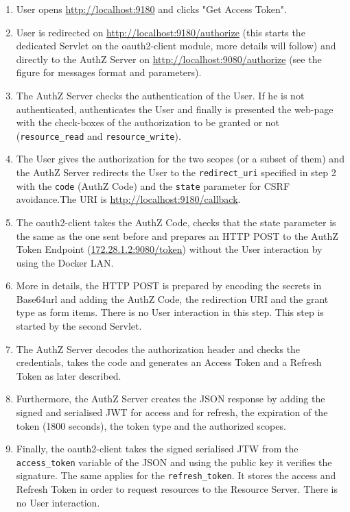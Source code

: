 \documentclass[a4paper,12pt]{article}
\begin{document}
\begin{enumerate}
    \item User opens \url{http://localhost:9180} and clicks "Get Access Token".
    \item User is redirected on \url{http://localhost:9180/authorize} (this starts the dedicated Servlet on the oauth2-client module, more details will follow) and directly to the AuthZ Server on \url{http://localhost:9080/authorize} (see the figure for messages format and parameters).
    \item The AuthZ Server checks the authentication of the User. If he is not authenticated, authenticates the User and finally is presented the web-page with the check-boxes of the authorization to be granted or not (\texttt{resource\_read} and \texttt{resource\_write}). 
    \item The User gives the authorization for the two scopes (or a subset of them) and the AuthZ Server redirects the User to the \texttt{redirect\_uri} specified in step 2 with the \texttt{code} (AuthZ Code) and the \texttt{state} parameter for CSRF avoidance.The URI is \url{http://localhost:9180/callback}.
    \item The oauth2-client takes the AuthZ Code, checks that the state parameter is the same as the one sent before and prepares an HTTP POST to the AuthZ Token Endpoint (\url{172.28.1.2:9080/token}) without the User interaction by using the Docker LAN.
    \item More in details, the HTTP POST is prepared by encoding the secrets in Base64url and adding the AuthZ Code, the redirection URI and the grant type as form items. There is no User interaction in this step. This step is started by the second Servlet.
    \item The AuthZ Server decodes the authorization header and checks the credentials, takes the code and generates an Access Token and a Refresh Token as later described.
    \item Furthermore, the AuthZ Server creates the JSON response by adding the signed and serialised JWT for access and for refresh, the expiration of the token (1800 seconds), the token type and the authorized scopes.
    \item Finally, the oauth2-client takes the signed serialised JTW from the \texttt{access\_token} variable of the JSON and using the public key it verifies the signature. The same applies for the \texttt{refresh\_token}. It stores the access and Refresh Token in order to request resources to the Resource Server. There is no User interaction.
\end{enumerate}
\end{document}
